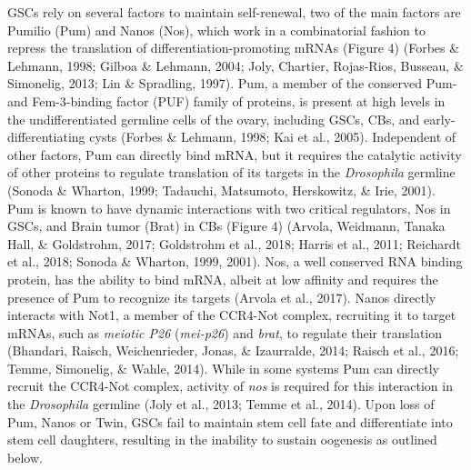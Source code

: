 \documentclass[12pt,twoside]{reedthesis}
\begin{document}
GSCs rely on several factors to maintain self-renewal, two of the main
factors are Pumilio (Pum) and Nanos (Nos), which work in a combinatorial
fashion to repress the translation of differentiation-promoting mRNAs
(Figure 4) (Forbes \& Lehmann, 1998; Gilboa \& Lehmann, 2004; Joly, Chartier, Rojas-Rios, Busseau, \& Simonelig, 2013; Lin \& Spradling, 1997).
Pum, a member of the conserved Pum- and Fem-3-binding factor (PUF)
family of proteins, is present at high levels in the undifferentiated
germline cells of the ovary, including GSCs, CBs, and
early-differentiating cysts (Forbes \& Lehmann, 1998; Kai et al., 2005). Independent of
other factors, Pum can directly bind mRNA, but it requires the catalytic
activity of other proteins to regulate translation of its targets in the
\emph{Drosophila} germline (Sonoda \& Wharton, 1999; Tadauchi, Matsumoto, Herskowitz, \& Irie, 2001). Pum is known
to have dynamic interactions with two critical regulators, Nos in GSCs,
and Brain tumor (Brat) in CBs (Figure 4) (Arvola, Weidmann, Tanaka Hall, \& Goldstrohm, 2017; Goldstrohm et al., 2018; Harris et al., 2011; Reichardt et al., 2018; Sonoda \& Wharton, 1999, 2001). Nos, a well conserved RNA binding protein, has the
ability to bind mRNA, albeit at low affinity and requires the presence
of Pum to recognize its targets (Arvola et al., 2017). Nanos directly
interacts with Not1, a member of the CCR4-Not complex, recruiting it to
target mRNAs, such as \emph{meiotic P26} (\emph{mei-p26}) and \emph{brat}, to regulate
their translation (Bhandari, Raisch, Weichenrieder, Jonas, \& Izaurralde, 2014; Raisch et al., 2016; Temme, Simonelig, \& Wahle, 2014).
While in some systems Pum can directly recruit the CCR4-Not complex,
activity of \emph{nos} is required for this interaction in the \emph{Drosophila}
germline (Joly et al., 2013; Temme et al., 2014). Upon loss of Pum, Nanos or Twin,
GSCs fail to maintain stem cell fate and differentiate into stem cell
daughters, resulting in the inability to sustain oogenesis as outlined
below.
\end{document}
